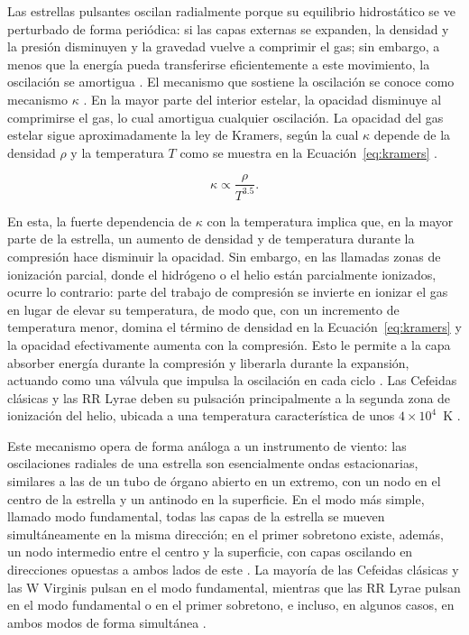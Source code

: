 \documentclass[12pt,letterpaper,oneside]{book}
\begin{document}
Las estrellas pulsantes oscilan radialmente porque su equilibrio hidrost\'atico se ve perturbado de forma peri\'odica: si las capas externas se expanden, la densidad y la presi\'on disminuyen y la gravedad vuelve a comprimir el gas; sin embargo, a menos que la energ\'ia pueda transferirse eficientemente a este movimiento, la oscilaci\'on se amortigua \citep{Karttunen2016,Carroll2017}. El mecanismo que sostiene la oscilaci\'on se conoce como mecanismo $\kappa$ \citep{Carroll2017}. En la mayor parte del interior estelar, la opacidad disminuye al comprimirse el gas, lo cual amortigua cualquier oscilaci\'on. La opacidad del gas estelar sigue aproximadamente la ley de Kramers, seg\'un la cual $\kappa$ depende de la densidad $\rho$ y la temperatura $T$ como se muestra en la Ecuaci\'on~\eqref{eq:kramers} \citep{Carroll2017}.

\begin{equation}
	\kappa \propto \frac{\rho}{T^{3.5}}.
	\label{eq:kramers}
\end{equation}

En esta, la fuerte dependencia de $\kappa$ con la temperatura implica que, en la mayor parte de la estrella, un aumento de densidad y de temperatura durante la compresi\'on hace disminuir la opacidad. Sin embargo, en las llamadas zonas de ionizaci\'on parcial, donde el hidr\'ogeno o el helio est\'an parcialmente ionizados, ocurre lo contrario: parte del trabajo de compresi\'on se invierte en ionizar el gas en lugar de elevar su temperatura, de modo que, con un incremento de temperatura menor, domina el t\'ermino de densidad en la Ecuaci\'on~\eqref{eq:kramers} y la opacidad efectivamente aumenta con la compresi\'on. Esto le permite a la capa absorber energ\'ia durante la compresi\'on y liberarla durante la expansi\'on, actuando como una v\'alvula que impulsa la oscilaci\'on en cada ciclo \citep{Carroll2017}. Las Cefeidas cl\'asicas y las RR Lyrae deben su pulsaci\'on principalmente a la segunda zona de ionizaci\'on del helio, ubicada a una temperatura caracter\'istica de unos $4\times10^4$~K \citep{Carroll2017}.

Este mecanismo opera de forma an\'aloga a un instrumento de viento: las oscilaciones radiales de una estrella son esencialmente ondas estacionarias, similares a las de un tubo de \'organo abierto en un extremo, con un nodo en el centro de la estrella y un antinodo en la superficie. En el modo m\'as simple, llamado modo fundamental, todas las capas de la estrella se mueven simult\'aneamente en la misma direcci\'on; en el primer sobretono existe, adem\'as, un nodo intermedio entre el centro y la superficie, con capas oscilando en direcciones opuestas a ambos lados de este \citep{Carroll2017}. La mayor\'ia de las Cefeidas cl\'asicas y las W Virginis pulsan en el modo fundamental, mientras que las RR Lyrae pulsan en el modo fundamental o en el primer sobretono, e incluso, en algunos casos, en ambos modos de forma simult\'anea \citep{Carroll2017}.
\end{document}
